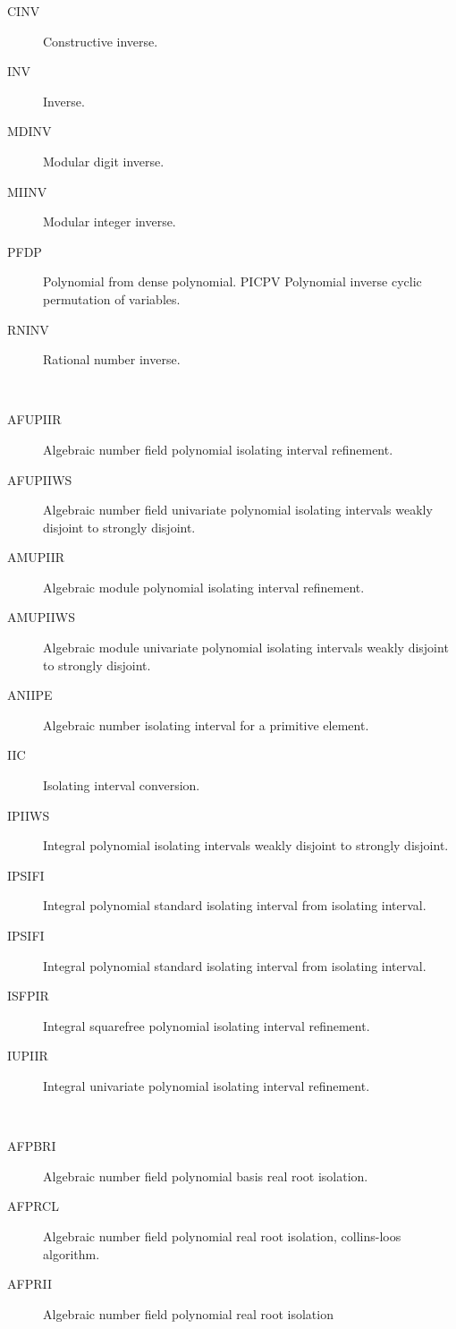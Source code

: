 \begin{description}
\begin{description}
  \item[CINV]  Constructive inverse.
  \item[INV]  Inverse.
  \item[MDINV]  Modular digit inverse.
  \item[MIINV]  Modular integer inverse.
  \item[PFDP]  Polynomial from dense polynomial. PICPV Polynomial inverse
    cyclic permutation of variables.
  \item[RNINV]  Rational number inverse.
  \end{description}
\item[isolating] \ \ 
  \begin{description}
  \item[AFUPIIR]  Algebraic number field polynomial isolating interval
    refinement.
  \item[AFUPIIWS]  Algebraic number field univariate polynomial isolating
    intervals weakly disjoint to strongly disjoint.
  \item[AMUPIIR]  Algebraic module polynomial isolating interval refinement.
  \item[AMUPIIWS]  Algebraic module univariate polynomial isolating intervals
    weakly disjoint to strongly disjoint.
  \item[ANIIPE]  Algebraic number isolating interval for a primitive element.
  \item[IIC]  Isolating interval conversion.
  \item[IPIIWS]  Integral polynomial isolating intervals weakly disjoint to
    strongly disjoint.
  \item[IPSIFI]  Integral polynomial standard isolating interval from
    isolating interval.
  \item[IPSIFI]  Integral polynomial standard isolating interval from
    isolating interval.
  \item[ISFPIR]  Integral squarefree polynomial isolating interval refinement.
  \item[IUPIIR]  Integral univariate polynomial isolating interval refinement.
  \end{description}
\item[isolation] \ \ 
  \begin{description}
  \item[AFPBRI]  Algebraic number field polynomial basis real root isolation.
  \item[AFPRCL]  Algebraic number field polynomial real root isolation,
    collins-loos algorithm.
  \item[AFPRII]  Algebraic number field polynomial real root isolation

\end{description}
\end{description}

